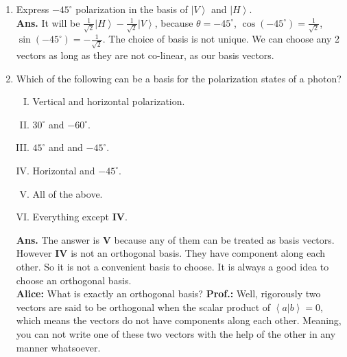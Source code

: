 \documentclass[12pt]{article}
\newcommand\lr{\left \langle}
\newcommand\rr{\right \rangle}
\newcommand\ls{\left |}
\newcommand\rs{\right |}
\newcommand\tbf[1]{\textbf{#1}}
\newcommand\ta{\tbf{Alice: }}
\newcommand\tp{\tbf{Prof.: }}
\begin{document}
\begin{enumerate}[1.]
\item Express $-45^\circ$ polarization in the basis of $\ls V \rr$ and $\ls H \rr$.  \\ \newline
\tbf{Ans. }It will be $\frac{1}{\sqrt{2}}\ls H \rr - \frac{1}{\sqrt{2}}\ls V \rr$, because $\theta = -45^\circ$, $\cos(-45^\circ)=\frac{1}{\sqrt{2}}$, $\sin(-45^\circ)=-\frac{1}{\sqrt{2}}$. \newline
The choice of basis is not unique. We can choose any 2 vectors as long as they are not co-linear, as our basis vectors. \\ \newline
\item Which of the following can be a basis for the polarization states of a photon? \newline
\begin{enumerate}[I.]
\item Vertical and horizontal polarization.
\item $30^\circ$ and $-60^\circ$.
\item $45^\circ$ and and $-45^\circ$.
\item Horizontal and $-45^\circ$.
\item All of the above.
\item Everything except \tbf{IV}. \\ \newline
\end{enumerate} 
\tbf{Ans. }The answer is \tbf{V} because any of them can be treated as basis vectors. However \tbf{IV} is not an orthogonal basis. They have component along each other. So it is not a convenient basis to choose. It is always a good idea to choose an orthogonal basis. \\ \newline
\ta What is exactly an orthogonal basis?
\tp Well, rigorously two vectors are said to be orthogonal when the scalar product of $\lr a \rs \left. b \rr = 0$, which means the vectors do not have components along each other. Meaning, you can not write one of these two vectors with the help of the other in any manner whatsoever.


\end{enumerate}
\end{document}

